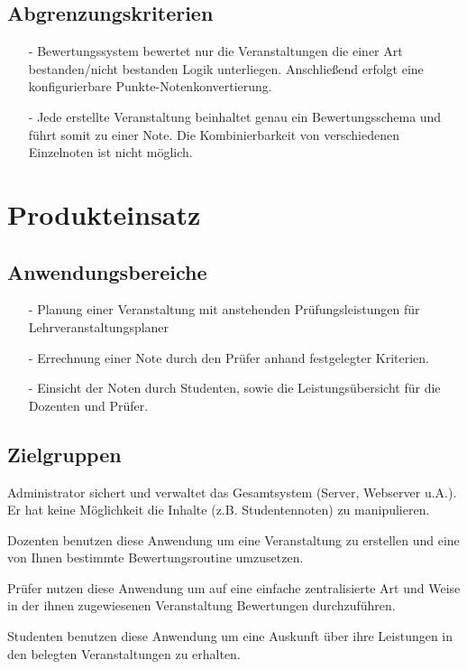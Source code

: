 		\subsection{Abgrenzungskriterien}
		\begin{itemize}
		\item[-]	Bewertungssystem bewertet nur die Veranstaltungen die einer Art bestanden/nicht bestanden Logik unterliegen. Anschließend erfolgt eine konfigurierbare Punkte-Notenkonvertierung.
		\item[-]	Jede erstellte Veranstaltung beinhaltet genau ein Bewertungsschema und führt somit zu einer Note. Die Kombinierbarkeit von verschiedenen Einzelnoten ist nicht möglich.
		\end{itemize}
		
	\section{Produkteinsatz}
	
		
		\subsection{Anwendungsbereiche}
		\begin{itemize}
		\item[-]	Planung einer Veranstaltung mit anstehenden Prüfungsleistungen für Lehrveranstaltungsplaner
		\item[-]	Errechnung einer Note durch den Prüfer anhand festgelegter Kriterien.
		\item[-]	Einsicht der Noten durch Studenten, sowie die Leistungsübersicht für die Dozenten und Prüfer.
		\end{itemize}
		
		
		\subsection{Zielgruppen}
		
		\begin{description}
		\item[Administrator] 	 Administrator sichert und verwaltet das Gesamtsystem (Server, Webserver u.A.). Er hat keine Möglichkeit die Inhalte (z.B. Studentennoten) zu manipulieren. 
		\item[Dozent]	Dozenten benutzen diese Anwendung um eine Veranstaltung zu erstellen und eine von Ihnen bestimmte Bewertungsroutine umzusetzen.
		\item[Prüfer] Prüfer nutzen diese Anwendung um auf eine einfache zentralisierte Art und Weise in der ihnen zugewiesenen Veranstaltung Bewertungen durchzuführen.
		\item[Studenten]	Studenten benutzen diese Anwendung um eine Auskunft über ihre Leistungen in den belegten Veranstaltungen zu erhalten.
		\end{description}

